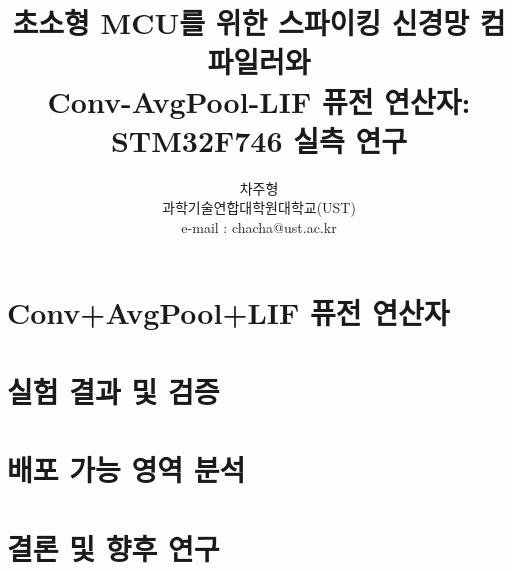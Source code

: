 \documentclass[preprint]{IEIE} %
\title{초소형 MCU를 위한 스파이킹 신경망 컴파일러와\\Conv-AvgPool-LIF 퓨전 연산자: STM32F746 실측 연구}
\author{차주형 \\ 과학기술연합대학원대학교(UST) \\ e-mail : chacha@ust.ac.kr}
\begin{document}
\maketitle
\makeabstract







\section{Conv+AvgPool+LIF 퓨전 연산자}


\section{실험 결과 및 검증}


\section{배포 가능 영역 분석}


\section{결론 및 향후 연구}



{\footnotesize

}
\end{document}
